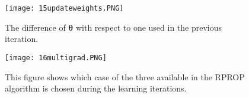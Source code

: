 \begin{figure}[h!]
	\centering
	\texttt{[image: 15updateweights.PNG]}
	\caption{The difference of $\bm{\theta}$ with respect to one used in the previous iteration. }
	\label{fig:app_updateE}
\end{figure}

\begin{figure}[h!]
	\centering
	\texttt{[image: 16multigrad.PNG]}
	\caption{This figure shows which case of the three available in the RPROP algorithm is chosen during the learning iterations.}
	\label{fig:app_multigradE}
\end{figure}





